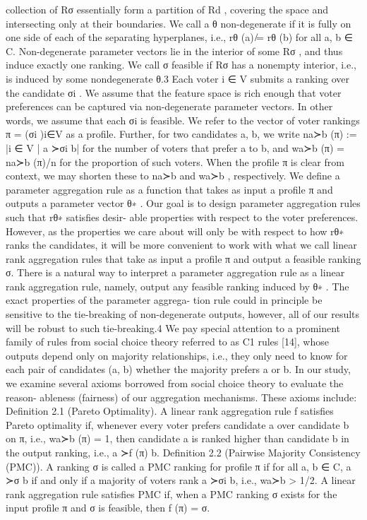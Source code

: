 \documentclass[10pt]{article}
\begin{document}
\begin{ReviewVerbatim}
collection of {Rσ } essentially form a partition of Rd , covering the space and intersecting only at
their boundaries.
We call a θ non-degenerate if it is fully on one side of each of the separating hyperplanes, i.e.,
rθ (a) ̸= rθ (b) for all a, b ∈ C. Non-degenerate parameter vectors lie in the interior of some Rσ ,
and thus induce exactly one ranking. We call σ feasible if Rσ has a nonempty interior, i.e., is induced
by some nondegenerate θ.3
Each voter i ∈ V submits a ranking over the candidate σi . We assume that the feature space is
rich enough that voter preferences can be captured via non-degenerate parameter vectors. In other
words, we assume that each σi is feasible. We refer to the vector of voter rankings π = (σi )i∈V as
a profile. Further, for two candidates a, b, we write na≻b (π) := |{i ∈ V | a ≻σi b}| for the number
of voters that prefer a to b, and wa≻b (π) = na≻b (π)/n for the proportion of such voters. When the
profile π is clear from context, we may shorten these to na≻b and wa≻b , respectively.
We define a parameter aggregation rule as a function that takes as input a profile π and outputs a
parameter vector θ∗ . Our goal is to design parameter aggregation rules such that rθ∗ satisfies desir-
able properties with respect to the voter preferences. However, as the properties we care about will
only be with respect to how rθ∗ ranks the candidates, it will be more convenient to work with what
we call linear rank aggregation rules that take as input a profile π and output a feasible ranking σ.
There is a natural way to interpret a parameter aggregation rule as a linear rank aggregation rule,
namely, output any feasible ranking induced by θ∗ . The exact properties of the parameter aggrega-
tion rule could in principle be sensitive to the tie-breaking of non-degenerate outputs, however, all
of our results will be robust to such tie-breaking.4
We pay special attention to a prominent family of rules from social choice theory referred to as C1
rules [14], whose outputs depend only on majority relationships, i.e., they only need to know for
each pair of candidates (a, b) whether the majority prefers a or b.
In our study, we examine several axioms borrowed from social choice theory to evaluate the reason-
ableness (fairness) of our aggregation mechanisms. These axioms include:
Definition 2.1 (Pareto Optimality). A linear rank aggregation rule f satisfies Pareto optimality if,
whenever every voter prefers candidate a over candidate b on π, i.e., wa≻b (π) = 1, then candidate
a is ranked higher than candidate b in the output ranking, i.e., a ≻f (π) b.
Definition 2.2 (Pairwise Majority Consistency (PMC)). A ranking σ is called a PMC ranking for
profile π if for all a, b ∈ C, a ≻σ b if and only if a majority of voters rank a ≻σi b, i.e., wa≻b > 1/2.
A linear rank aggregation rule satisfies PMC if, when a PMC ranking σ exists for the input profile
π and σ is feasible, then f (π) = σ.


\end{ReviewVerbatim}
\end{document}
